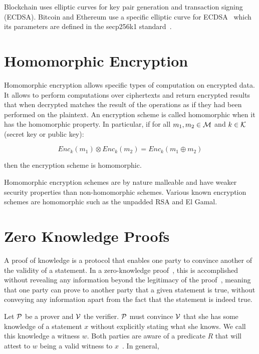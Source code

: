 Blockchain uses elliptic curves for key pair generation and transaction signing (ECDSA). Bitcoin and Ethereum use a specific elliptic curve for ECDSA~\cite{ecdsa} which its parameters are defined in the secp256k1 standard~\cite{secp}.

\section{Homomorphic Encryption}
\label{preliminaries:homo}

Homomorphic encryption allows specific types of computation on encrypted data. It allows to perform computations over ciphertexts and return encrypted results that when decrypted matches the result of the operations as if they had been performed on the plaintext. An encryption scheme is called homomorphic when it has the homomorphic property. In particular, if for all $m_1, m_2 \in \mathcal{M}$ and $k \in \mathcal{K}$ (secret key or public key):

\begin{equation*}
  Enc_k(m_1) \otimes Enc_k(m_2) = Enc_k(m_1 \oplus m_2)
\end{equation*}

then the encryption scheme is homomorphic.

Homomorphic encryption schemes are by nature malleable and have weaker security properties than non-homomorphic schemes. Various known encryption schemes are homomorphic such as the unpadded RSA and El Gamal.

\section{Zero Knowledge Proofs}
\label{zkp}

A proof of knowledge is a protocol that enables one party to convince another of the validity of a statement.
In a zero-knowledge proof~\cite{zkp}, this is accomplished without revealing any information beyond the legitimacy of the proof~\cite{kiagias:crypto},
meaning that one party can prove to another party that a given statement is true, without conveying any information apart from the fact that the statement is indeed true.

Let $\mathcal{P}$ be a prover and $\mathcal{V}$ the verifier. $\mathcal{P}$ must convince $\mathcal{V}$ that she has some
knowledge of a statement $x$ without explicitly stating what she knows. We call this knowledge a witness $w$.
Both parties are aware of a predicate $R$ that will attest to $w$ being a valid witness to $x$~\cite{kiagias:crypto}. In general,

